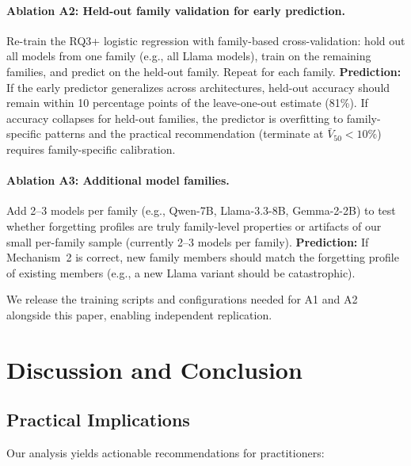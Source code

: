 \documentclass[11pt]{article}
\begin{document}
\paragraph{Ablation A2: Held-out family validation for early prediction.}
Re-train the RQ3+ logistic regression with family-based cross-validation: hold out all models from one family (e.g., all Llama models), train on the remaining families, and predict on the held-out family.  Repeat for each family.  \textbf{Prediction:} If the early predictor generalizes across architectures, held-out accuracy should remain within 10 percentage points of the leave-one-out estimate (81\%).  If accuracy collapses for held-out families, the predictor is overfitting to family-specific patterns and the practical recommendation (terminate at $\bar{V}_{50} < 10\%$) requires family-specific calibration.

\paragraph{Ablation A3: Additional model families.}
Add 2--3 models per family (e.g., Qwen-7B, Llama-3.3-8B, Gemma-2-2B) to test whether forgetting profiles are truly family-level properties or artifacts of our small per-family sample (currently 2--3 models per family).  \textbf{Prediction:} If Mechanism~2 is correct, new family members should match the forgetting profile of existing members (e.g., a new Llama variant should be catastrophic).

We release the training scripts and configurations needed for A1 and A2 alongside this paper, enabling independent replication.


\section{Discussion and Conclusion}

\subsection{Practical Implications}

Our analysis yields actionable recommendations for practitioners:
\end{document}
